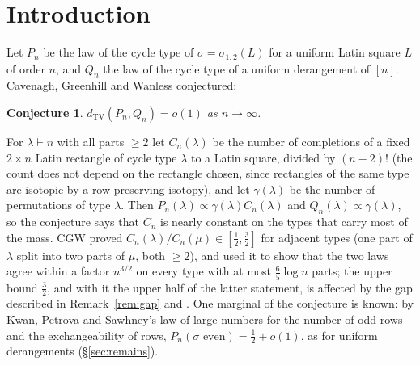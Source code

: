 \documentclass[11pt]{article}
\newtheorem{conjecture}[theorem]{Conjecture}
\theoremstyle{definition}
\newcommand{\dtv}{d_{\mathrm{TV}}}
\newcommand{\PP}{P}
\newcommand{\QQ}{Q}
\newcommand{\CC}{C}
\begin{document}
\begin{abstract}
mixing are not proved, types of exponentially small probability), and locate the
remaining difficulty: every exact identity we have found inside the conditioned space is
fair, upper bounds on events at sparse sets of cells in a uniform completion of a fixed
$2\times n$ rectangle are now available, lower bounds at scale $n$ on cycle lengths at
the first square-selected column pair and the fixed-position form of the needed
``different cycles'' bound are proved, and what is missing is a lower bound for
a constant-probability event at positions selected by the square --- at the first
candidate, a positive density of good pairs across the cut between the two marked rows.  Along the
way we observe that the published proof of the upper bound in Lemma~3.12 of
Cavenagh--Greenhill--Wanless has a gap for every split other than $(2,2)$; our results do not
depend on that bound, and we re-derive from the surviving direction the tail estimate on
the number of cycles that the reduction theorem needs.
\end{abstract}

\section{Introduction}

Let $\PP_n$ be the law of the cycle type of $\sigma=\sigma_{1,2}(L)$ for a uniform Latin
square $L$ of order $n$, and $\QQ_n$ the law of the cycle type of a uniform derangement of
$[n]$.  Cavenagh, Greenhill and Wanless \cite[Conj.~6.1]{CGW08} conjectured:

\begin{conjecture}\label{conj:cgw}
$\dtv(\PP_n,\QQ_n)=o(1)$ as $n\to\infty$.
\end{conjecture}

For $\lambda\vdash n$ with all parts $\ge2$ let $\CC_n(\lambda)$ be the number of
completions of a fixed $2\times n$ Latin rectangle of cycle type $\lambda$ to a Latin
square, divided by $(n-2)!$ (the count does not depend on the rectangle chosen, since
rectangles of the same type are isotopic by a row-preserving isotopy), and let
$\gamma(\lambda)$ be the number of permutations of type $\lambda$.  Then
$\PP_n(\lambda)\propto\gamma(\lambda)\CC_n(\lambda)$ and
$\QQ_n(\lambda)\propto\gamma(\lambda)$, so the conjecture says that $\CC_n$ is nearly
constant on the types that carry most of the mass.  CGW proved
$\CC_n(\lambda)/\CC_n(\mu)\in[\tfrac12,\tfrac32]$ for adjacent types (one part of
$\lambda$ split into two parts of $\mu$, both $\ge2$), and used it to show that the two
laws agree within a factor $n^{3/2}$ on every type with at most $\tfrac65\log n$ parts; the upper bound $\tfrac32$, and
with it the upper half of the latter statement, is affected by the gap described in
Remark~\ref{rem:gap} and \cite{gapnote}.  One marginal of the conjecture is known: by
Kwan, Petrova and Sawhney's law of large numbers for the number of odd rows
\cite[Thm.~1.3(1)]{KPS25} and the exchangeability of rows,
$\PP_n(\sigma\text{ even})=\tfrac12+o(1)$, as for uniform derangements
(\S\ref{sec:remains}).
\end{document}
